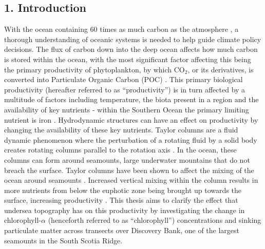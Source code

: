 \documentclass[
	a4paper, %
	10pt, %
	unnumberedsections, %
	twoside, %
]{LTJournalArticle}
\begin{document}
\begin{multicols}{2}

\section{1. Introduction}

With the ocean containing 60 times as much carbon as the atmosphere \citep{ref44}, a thorough understanding of oceanic systems
is needed to help guide climate policy decisions. The flux of carbon down into the deep ocean affects how much carbon is stored
within the ocean, with the most significant factor affecting this being the primary productivity of phytoplankton, by which CO$_2$,
or its derivatives, is converted into Particulate Organic Carbon (POC) \citep{ref45}. This primary biological productivity
(hereafter referred to as “productivity”) is in turn affected by a multitude of factors including temperature, the biota present
in a region and the availability of key nutrients - within the Southern Ocean the primary limiting nutrient is iron \citep{ref51}.
Hydrodynamic structures can have an effect on productivity by changing the availability of these key nutrients.
Taylor columns are a fluid dynamic phenomenon where the perturbation of a rotating fluid by a solid body creates rotating
columns parallel to the rotation axis \citep{ref47}. In the ocean, these columns can form around seamounts, large underwater
mountains that do not breach the surface. Taylor columns have been shown to affect the mixing of the ocean around seamounts
\citep{ref30}. Increased vertical mixing within the column results in more nutrients from below the euphotic zone being
brought up towards the surface, increasing productivity \citep{ref52}. This thesis aims to clarify the effect that undersea
topography has on this productivity by investigating the change in chlorophyll-$\alpha$ (henceforth referred to as “chlorophyll”)
concentrations and sinking particulate matter across transects over Discovery Bank, one of the largest seamounts in the South
Scotia Ridge.


\end{multicols}
\end{document}
